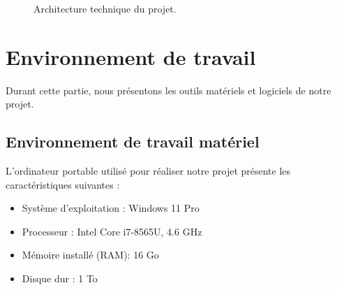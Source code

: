 \begin{figure}[H]
        \centering
        \caption{Architecture technique du projet.}
        \label{fig:archi_glob}
\end{figure}

\section{Environnement de travail}
Durant cette partie, nous présentons les outils matériels et logiciels de notre projet. 

\subsection{Environnement de travail matériel}
L'ordinateur portable utilisé pour réaliser notre projet présente les caractéristiques suivantes :
\begin{itemize}
\item {Système d’exploitation : Windows 11 Pro}
\item {Processeur :  Intel Core i7-8565U, 4.6 GHz} 
\item {Mémoire installé (RAM): 16 Go}
\item {Disque dur : 1 To}
\end{itemize}

